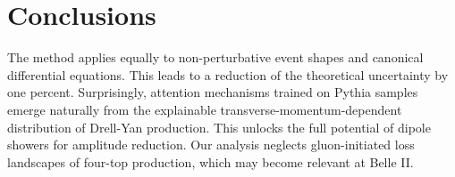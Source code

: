\section{Conclusions}\label{sec:conclusions}

The method applies equally to non-perturbative event shapes and
canonical differential equations. This leads to a reduction of the
theoretical uncertainty by one percent. Surprisingly, attention
mechanisms trained on Pythia samples emerge naturally from the
explainable transverse-momentum-dependent distribution of Drell-Yan
production. This unlocks the full potential of dipole showers for
amplitude reduction. Our analysis neglects gluon-initiated loss
landscapes of four-top production, which may become relevant at Belle
II.

